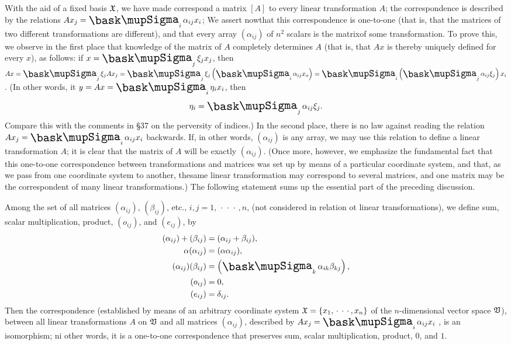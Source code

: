 With the aid of a fixed basis \(\mathfrak{X}\), we have made correspond a matrix
\([A]\) to every linear transformation \(A\); the correspondence is described by
the relations \(Ax_j = \sumx_i \alpha_{ij} x_i\); We assert nowthat this
correspondence is one-to-one (that is, that the matrices of two different
transformations are different), and that every array \((\alpha_{ij})\) of \(n^2\) scalars is the
matrixof some transformation. To prove this, we observe in the first place that
knowledge of the matrix of \(A\) completely determines \(A\) (that is, that \(Ax\) is
thereby uniquely defined for every \(x\)), as follows: if \(x = \sumx_j \xi_j x_j\), then \(Ax = \sumx_j \xi_j Ax_j = \sumx_j \xi_j \left( \sumx_i \alpha_{ij} x_o\right) = \sumx_i \left(\sumx_j \alpha_{ij} \xi_j\right) x_i\). (In other words, it \(y = Ax = \sumx_i \eta_i x_i\), then
\begin{equation*}
    \eta_i = \sumx_j \alpha_{ij} \xi_j.
\end{equation*}
Compare this with the comments in §37 on the perversity of indices.) In the
second place, there is no law against reading the relation \(Ax_j = \sumx_i
\alpha_{ij} x_i\) backwards. If, in other words, \((\alpha_{ij})\) is any array,
we may use this relation to define a linear transformation \(A\); it is clear
that the matrix of \(A\) will be exactly \((\alpha_{ij})\). (Once more, however,
we emphasize the fundamental fact that this one-to-one correspondence between
transformations and matrices was set up by means of a particular coordinate
system, and that, as we pass from one coordinate system to another, thesame
linear transformation may correspond to several matrices, and one matrix may be
the correspondent of many linear transformations.) The following statement sums
up the essential part of the preceding discussion.

\begin{theorem}
    Among the set of all matrices \((\alpha_{ij})\), \((\beta_{ij})\), etc.,
    \(i, j = 1, \,\cdot\,\cdot\,\cdot\,, n\), (not considered in relation ot
    linear transformations), we define sum, scalar multiplication, product,
    \((o_{ij})\), and \((e_{ij})\), by
    \begin{align*}
        (\alpha_{ij}) + (\beta_{ij}) & = (\alpha_{ij} + \beta_{ij}), \\
        \alpha (\alpha_{ij}) & = (\alpha \alpha_{ij}), \\
        (\alpha_{ij}) (\beta_{ij}) & = \left(\sumx_k \alpha_{ik} \beta_{kj}\right),\\
        (o_{ij}) & = 0, \\
        (e_{ij}) & = \delta_{ij}.
    \end{align*}
    Then the correspondence (established by means of an arbitrary coordinate
    system \(\mathfrak{X} = \{x_1, \,\cdot\,\cdot\,\cdot\,, x_n\}\) of the
    \(n\)-dimensional vector space \(\mathfrak{V}\)), between all linear
    transformations \(A\) on \(\mathfrak{V}\) and all matrices \((\alpha_{ij})\),
    described by \(Ax_j = \sumx_i \alpha_{ij} x_i\) , is an isomorphism; ni
    other words, it is a one-to-one correspondence that preserves sum, scalar
    multiplication, product, \(0\), and \(1\).
\end{theorem}

